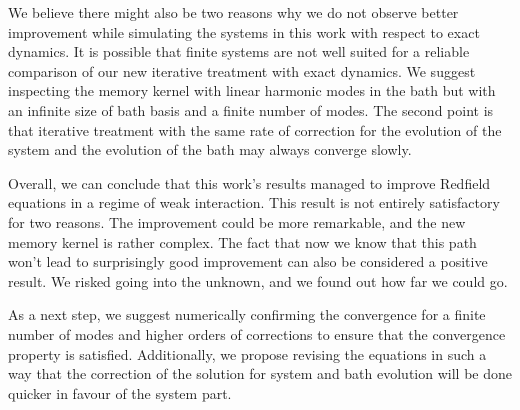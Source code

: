 We believe there might also be two reasons why we do not observe better improvement while simulating the systems in this work with respect to exact dynamics. It is possible that finite systems are not well suited for a reliable comparison of our new iterative treatment with exact dynamics. We suggest inspecting the memory kernel with linear harmonic modes in the bath but with an infinite size of bath basis and a finite number of modes. The second point is that iterative treatment with the same rate of correction for the evolution of the system and the evolution of the bath may always converge slowly. 

Overall, we can conclude that this work's results managed to improve Redfield equations in a regime of weak interaction. This result is not entirely satisfactory for two reasons. The improvement could be more remarkable, and the new memory kernel is rather complex. The fact that now we know that this path won't lead to surprisingly good improvement can also be considered a positive result. We risked going into the unknown, and we found out how far we could go. 

As a next step, we suggest numerically confirming the convergence for a finite number of modes and higher orders of corrections to ensure that the convergence property is satisfied. Additionally, we propose revising the equations in such a way that the correction of the solution for system and bath evolution will be done quicker in favour of the system part. 
